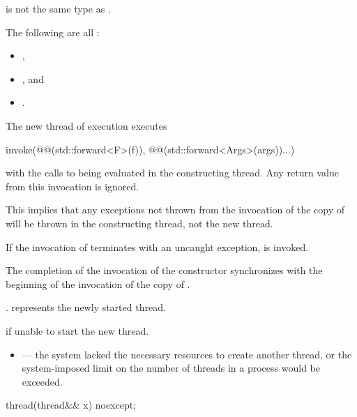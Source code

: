 \begin{itemdescr}
\pnum
\constraints
{} is not the same type as .

\pnum
\mandates
The following are all :
\begin{itemize}
\item {},
\item {}, and
\item {}.
\end{itemize}

\pnum
\effects
The new thread of execution executes
\begin{codeblock}
invoke(@@(std::forward<F>(f)), @@(std::forward<Args>(args))...)
\end{codeblock}
with the calls to
 being evaluated in the constructing thread.
Any return value from this invocation is ignored.
\begin{note}
This implies that any exceptions not thrown from the invocation of the copy
of  will be thrown in the constructing thread, not the new thread.
\end{note}
If the invocation of  terminates with an uncaught exception,
 is invoked.

\pnum
\sync
The completion of the invocation of the constructor
synchronizes with the beginning of the invocation of the copy of .

\pnum
\ensures
{}.  represents the newly started thread.

\pnum
\throws
{} if unable to start the new thread.

\pnum
\errors
\begin{itemize}
\item {} --- the system lacked the necessary
resources to create another thread, or the system-imposed limit on the number of
threads in a process would be exceeded.
\end{itemize}
\end{itemdescr}

%
\begin{itemdecl}
thread(thread&& x) noexcept;
\end{itemdecl}

